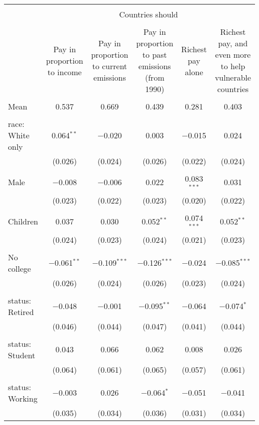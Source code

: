 
\begin{tabular}{@{\extracolsep{5pt}}lccccc} 
\\[-1.8ex]\hline 
\hline \\[-1.8ex] 
 & \multicolumn{5}{c}{Countries should} \\ 
\cline{2-6} 
\\[-1.8ex] & Pay in proportion to income & Pay in proportion to current emissions & Pay in proportion to past emissions (from 1990) & Richest pay alone & Richest pay, and even more to help vulnerable countries \\ 
\hline \\[-1.8ex] 
 Mean & 0.537 & 0.669 & 0.439 & 0.281 & 0.403  \\ \hline \\[-1.8ex] race: White only & 0.064$^{**}$ & $-$0.020 & 0.003 & $-$0.015 & 0.024 \\ 
  & (0.026) & (0.024) & (0.026) & (0.022) & (0.024) \\ 
  & & & & & \\ 
 Male & $-$0.008 & $-$0.006 & 0.022 & 0.083$^{***}$ & 0.031 \\ 
  & (0.023) & (0.022) & (0.023) & (0.020) & (0.022) \\ 
  & & & & & \\ 
 Children & 0.037 & 0.030 & 0.052$^{**}$ & 0.074$^{***}$ & 0.052$^{**}$ \\ 
  & (0.024) & (0.023) & (0.024) & (0.021) & (0.023) \\ 
  & & & & & \\ 
 No college & $-$0.061$^{**}$ & $-$0.109$^{***}$ & $-$0.126$^{***}$ & $-$0.024 & $-$0.085$^{***}$ \\ 
  & (0.026) & (0.024) & (0.026) & (0.023) & (0.024) \\ 
  & & & & & \\ 
 status: Retired & $-$0.048 & $-$0.001 & $-$0.095$^{**}$ & $-$0.064 & $-$0.074$^{*}$ \\ 
  & (0.046) & (0.044) & (0.047) & (0.041) & (0.044) \\ 
  & & & & & \\ 
 status: Student & 0.043 & 0.066 & 0.062 & 0.008 & 0.026 \\ 
  & (0.064) & (0.061) & (0.065) & (0.057) & (0.061) \\ 
  & & & & & \\ 
 status: Working & $-$0.003 & 0.026 & $-$0.064$^{*}$ & $-$0.051 & $-$0.041 \\ 
  & (0.035) & (0.034) & (0.036) & (0.031) & (0.034) \\ 

\end{tabular}
